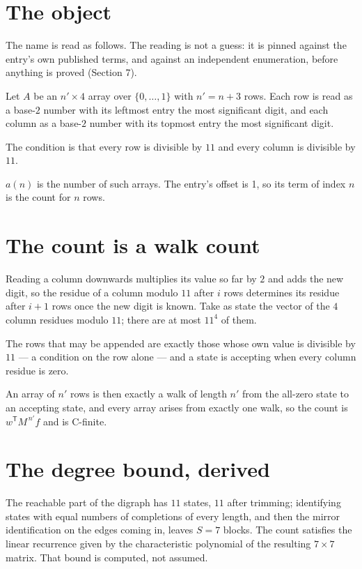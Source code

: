 \documentclass[11pt]{article}
\theoremstyle{definition}
\begin{document}
\section{The object}

The name is read as follows. The reading is not a guess: it is pinned against the entry's own published terms, and against an independent enumeration, before anything is proved (Section 7).

Let $A$ be an $n' \times 4$ array over $\{0,\dots,1\}$ with $n' = n + 3$ rows. Each row is read as a base-$2$ number with its leftmost entry the most significant digit, and each column as a base-$2$ number with its topmost entry the most significant digit.

The condition is that every row is divisible by $11$ and every column is divisible by $11$.

$a(n)$ is the number of such arrays. The entry's offset is 1, so its term of index $n$ is the count for $n$ rows.

\section{The count is a walk count}

Reading a column downwards multiplies its value so far by $2$ and adds the new digit, so the residue of a column modulo $11$ after $i$ rows determines its residue after $i+1$ rows once the new digit is known. Take as state the vector of the $4$ column residues modulo $11$; there are at most $11^{4}$ of them.

The rows that may be appended are exactly those whose own value is divisible by $11$ --- a condition on the row alone --- and a state is accepting when every column residue is zero.

An array of $n'$ rows is then exactly a walk of length $n'$ from the all-zero state to an accepting state, and every array arises from exactly one walk, so the count is $w^{\mathsf T}M^{\,n'}f$ and is C-finite.

\section{The degree bound, derived}

The reachable part of the digraph has $11$ states, $11$ after trimming; identifying states with equal numbers of completions of every length, and then the mirror identification on the edges coming in, leaves $S = 7$ blocks. The count satisfies the linear recurrence given by the characteristic polynomial of the resulting $7\times7$ matrix. That bound is computed, not assumed.
\end{document}
